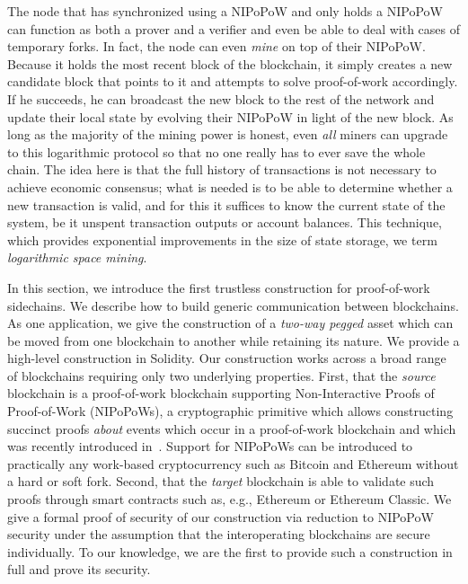 The node that has synchronized using a NIPoPoW and only holds a NIPoPoW can
function as both a prover and a verifier and even be able to deal with cases
of temporary forks. In fact, the node can even \emph{mine} on top of their
NIPoPoW. Because it holds the most recent block of the blockchain, it simply
creates a new candidate block that points to it and attempts to solve
proof-of-work accordingly. If he succeeds, he can broadcast the new block to the
rest of the network and update their local state by evolving their NIPoPoW in
light of the new block. As long as the majority of the mining power is honest,
even \emph{all} miners can upgrade to this logarithmic protocol so that no one
really has to ever save the whole chain. The idea here is that the full history
of transactions is not necessary to achieve economic consensus; what is needed
is to be able to determine whether a new transaction is valid, and for this it
suffices to know the current state of the system, be it unspent transaction
outputs or account balances. This technique, which provides exponential
improvements in the size of state storage, we term
\emph{logarithmic space mining}.


\ifdraft
{}
In this section, we introduce the first
trustless construction for proof-of-work sidechains. We describe how to build
generic communication between blockchains. As one application, we give the
construction of a \emph{two-way pegged} asset which can be moved from one
blockchain to another while retaining its nature. We provide a high-level
construction in Solidity. Our construction works across a broad range of
blockchains requiring only two underlying properties. First, that the
\emph{source} blockchain is a proof-of-work blockchain supporting
Non-Interactive Proofs of Proof-of-Work (NIPoPoWs), a cryptographic primitive
which allows constructing succinct proofs \emph{about} events which occur in a
proof-of-work blockchain and which was recently introduced in~\cite{nipopows}.
Support for NIPoPoWs can be introduced to practically any
work-based cryptocurrency such as Bitcoin and Ethereum without a hard or soft
fork. Second, that the \emph{target} blockchain is able to validate such proofs
through smart contracts such as, e.g., Ethereum or Ethereum
Classic.
We give a formal proof of security of our construction via
reduction to NIPoPoW security under the assumption that the interoperating
blockchains are secure individually.
To our knowledge, we are the first to
provide such a construction in
full and prove its security.
\fi

